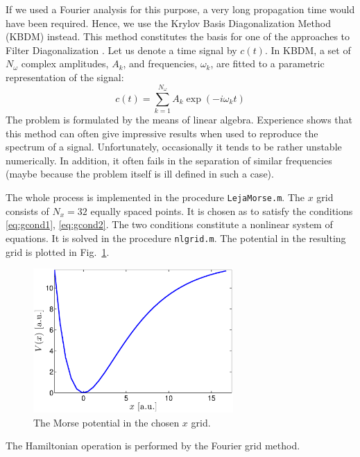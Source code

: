 \documentclass[12pt, a4paper]{article}
\begin{document}
If we used a Fourier analysis for this purpose, a very long propagation time would have been required. Hence, we use the Krylov Basis Diagonalization Method (KBDM) instead. This method constitutes the basis for one of the approaches to Filter Diagonalization  \cite{FDM}. Let us denote a time signal by $c(t)$. In KBDM, a set of $N_\omega$ complex amplitudes, $A_k$, and frequencies, $\omega_k$, are fitted to a parametric representation of the signal:
\begin{equation}
	c(t) = \sum_{k=1}^{N_\omega}A_k \exp(-i\omega_k t)
\end{equation}
The problem is formulated by the means of linear algebra. Experience shows that this method can often give impressive results when used to reproduce the spectrum of a signal. Unfortunately, occasionally it tends to be rather unstable numerically. In addition, it often fails in the separation of similar frequencies (maybe because the problem itself is ill defined in such a case).

The whole process is implemented in the procedure \texttt{LejaMorse.m}. The $x$ grid consists of $N_x=32$ equally spaced points. It is chosen as to satisfy the conditions \eqref{eq:gcond1}, \eqref{eq:gcond2}. The two conditions constitute a nonlinear system of equations. It is solved in the procedure \texttt{nlgrid.m}. The potential in the resulting grid is plotted in Fig.~\ref{fig:VMorse}.

\begin{figure}[htb]
	\centering\includegraphics[width=3in]{morseV}
	\caption{The Morse potential in the chosen $x$ grid.}\label{fig:VMorse}
\end{figure}

The Hamiltonian operation is performed by the Fourier grid method.
\end{document}

